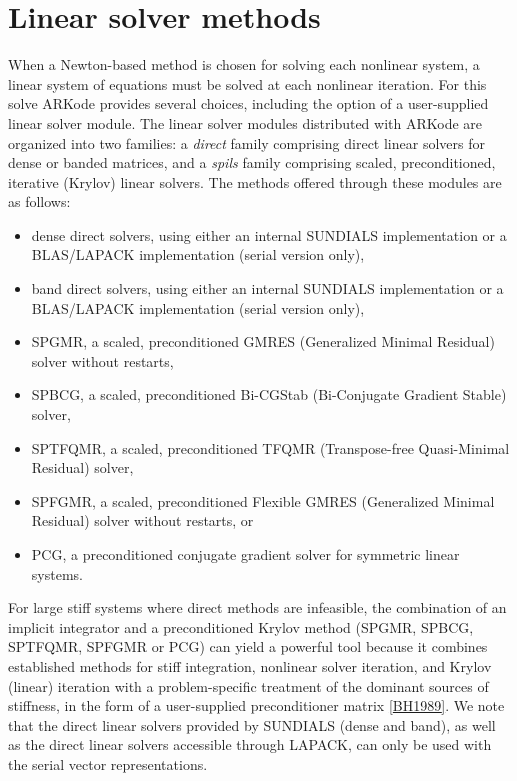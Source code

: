 \documentclass[letterpaper,10pt,english]{sphinxmanual}
\begin{document}
\section{Linear solver methods}
\label{Mathematics:linear-solver-methods}\label{Mathematics:mathematics-linear}
When a Newton-based method is chosen for solving each nonlinear
system, a linear system of equations must be solved at each nonlinear
iteration.  For this solve ARKode provides several choices, including
the option of a user-supplied linear solver module.  The linear solver
modules distributed with ARKode are organized into two families: a
\emph{direct} family comprising direct linear solvers for dense or banded
matrices, and a \emph{spils} family comprising scaled, preconditioned,
iterative (Krylov) linear solvers.  The methods offered through these
modules are as follows:
\begin{itemize}
\item {} 
dense direct solvers, using either an internal SUNDIALS
implementation or a BLAS/LAPACK implementation (serial version
only),

\item {} 
band direct solvers, using either an internal SUNDIALS
implementation or a BLAS/LAPACK implementation (serial version
only),

\item {} 
SPGMR, a scaled, preconditioned GMRES (Generalized Minimal Residual)
solver without restarts,

\item {} 
SPBCG, a scaled, preconditioned Bi-CGStab (Bi-Conjugate Gradient
Stable) solver,

\item {} 
SPTFQMR, a scaled, preconditioned TFQMR (Transpose-free
Quasi-Minimal Residual) solver,

\item {} 
SPFGMR, a scaled, preconditioned Flexible GMRES (Generalized Minimal
Residual) solver without restarts, or

\item {} 
PCG, a preconditioned conjugate gradient solver for symmetric linear
systems.

\end{itemize}

For large stiff systems where direct methods are infeasible, the
combination of an implicit integrator and a preconditioned
Krylov method (SPGMR, SPBCG, SPTFQMR, SPFGMR or PCG) can yield a
powerful tool because it combines established methods for stiff
integration, nonlinear solver iteration, and Krylov (linear) iteration
with a problem-specific treatment of the dominant sources of
stiffness, in the form of a user-supplied preconditioner matrix
{\hyperref[References:bh1989]{{[}BH1989{]}}}.  We note that the direct linear solvers
provided by SUNDIALS (dense and band), as well as the direct linear
solvers accessible through LAPACK, can only be used with the serial
vector representations.
\end{document}
